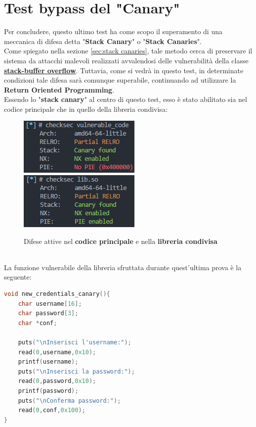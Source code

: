 \section{Test bypass del "Canary"}
\label{sec:Test_5}
Per concludere, questo ultimo test ha come scopo il superamento di una meccanica di difesa detta "\textbf{Stack Canary}" o "\textbf{Stack Canaries}".\\ Come spiegato nella sezione \ref{sec:stack canaries}, tale metodo cerca di preservare il sistema da attacchi malevoli realizzati
avvalendosi delle vulnerabilità della classe \hyperref[subsec:Stack-buffer overflow]{\textbf{stack-buffer overflow}}. Tuttavia, come si vedrà in questo test, in determinate condizioni tale difesa sarà comunque superabile, continuando ad utilizzare la \textbf{Return Oriented Programming}.\\
Essendo lo "\textbf{stack canary}" al centro di questo test, esso è stato abilitato sia nel codice principale che in quello della libreria condivisa:
\begin{figure}[htbp]
      \centering
      \includegraphics[width=.3\textwidth]{images/sec-vuln-canary.png}\hfil
      \includegraphics[width=.3\textwidth]{images/sec-canary-lib.png}
      \caption{Difese attive nel \textbf{codice principale} e nella \textbf{libreria condivisa}}\label{fig:checksec2}
\end{figure}
\\La funzione vulnerabile della libreria sfruttata durante quest'ultima prova è la seguente:
\begin{lstlisting}[language=C, label=new credentials canary, caption={Funzione \textbf{new\_credentials\_canary}() della libreria condivisa.}, style=C lang]
void new_credentials_canary(){
    char username[16];
    char password[3];
    char *conf;
    
    puts("\nInserisci l'username:");
    read(0,username,0x10);
    printf(username);
    puts("\nInserisci la password:");
    read(0,password,0x10);
    printf(password);
    puts("\nConferma password:");
    read(0,conf,0x100);
}
\end{lstlisting}
